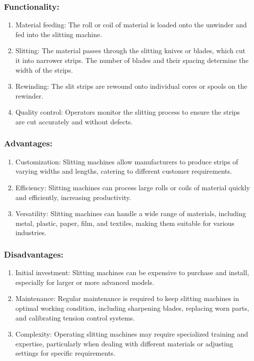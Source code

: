 \subsubsection{Functionality:}

\begin{enumerate}
\item
  Material feeding: The roll or coil of material is loaded onto the
  unwinder and fed into the slitting machine.
\item
  Slitting: The material passes through the slitting knives or blades,
  which cut it into narrower strips. The number of blades and their
  spacing determine the width of the strips.
\item
  Rewinding: The slit strips are rewound onto individual cores or spools
  on the rewinder.
\item
  Quality control: Operators monitor the slitting process to ensure the
  strips are cut accurately and without defects.
\end{enumerate}

\subsubsection{Advantages:}

\begin{enumerate}
\item
  Customization: Slitting machines allow manufacturers to produce strips
  of varying widths and lengths, catering to different customer
  requirements.
\item
  Efficiency: Slitting machines can process large rolls or coils of
  material quickly and efficiently, increasing productivity.
\item
  Versatility: Slitting machines can handle a wide range of materials,
  including metal, plastic, paper, film, and textiles, making them
  suitable for various industries.
\end{enumerate}

\subsubsection{Disadvantages:}

\begin{enumerate}
\item
  Initial investment: Slitting machines can be expensive to purchase and
  install, especially for larger or more advanced models.
\item
  Maintenance: Regular maintenance is required to keep slitting machines
  in optimal working condition, including sharpening blades, replacing
  worn parts, and calibrating tension control systems.
\item
  Complexity: Operating slitting machines may require specialized
  training and expertise, particularly when dealing with different
  materials or adjusting settings for specific requirements.
\end{enumerate}

